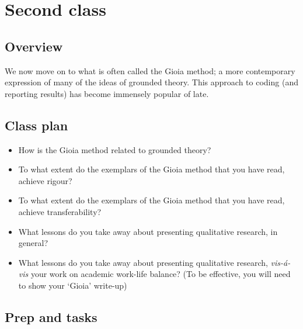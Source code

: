 \documentclass[]{book}
\theoremstyle{definition}
\theoremstyle{definition}
\theoremstyle{definition}
\theoremstyle{remark}
\begin{document}
\hypertarget{second-class-4}{%
\section*{Second class}\label{second-class-4}}

\hypertarget{overview-9}{%
\subsection*{Overview}\label{overview-9}}

We now move on to what is often called the Gioia method; a more
contemporary expression of many of the ideas of grounded theory. This
approach to coding (and reporting results) has become immensely popular
of late.

\hypertarget{class-plan-9}{%
\subsection*{Class plan}\label{class-plan-9}}

\begin{itemize}
\item
  How is the Gioia method related to grounded theory?
\item
  To what extent do the exemplars of the Gioia method that you have
  read, achieve rigour?
\item
  To what extent do the exemplars of the Gioia method that you have
  read, achieve transferability?
\item
  What lessons do you take away about presenting qualitative research,
  in general?
\item
  What lessons do you take away about presenting qualitative research,
  \emph{vis-á-vis} your work on academic work-life balance? (To be
  effective, you will need to show your `Gioia' write-up)
\end{itemize}

\hypertarget{prep-and-tasks-9}{%
\subsection*{Prep and tasks}\label{prep-and-tasks-9}}
\end{document}
